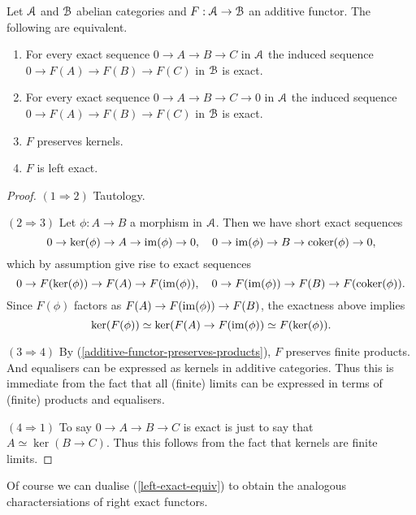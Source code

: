 \begin{lemma}
  \label{left-exact-equiv}
  Let $\mathcal{A}$ and $\mathcal{B}$ abelian categories and $F : \mathcal{A} \to \mathcal{B}$ an additive
  functor. The following are equivalent.
  \begin{enumerate}
  \item For every exact sequence $0 \to A \to B \to C$ in $\mathcal{A}$ the
    induced sequence $0 \to F(A) \to F(B) \to F(C)$ in $\mathcal{B}$ is exact.
  \item For every exact sequence $0 \to A \to B \to C \to 0$ in $\mathcal{A}$
    the induced sequence $0 \to F(A) \to F(B) \to F(C)$ in $\mathcal{B}$ is
    exact.
  \item $F$ preserves kernels.
  \item $F$ is left exact.
  \end{enumerate}
\end{lemma}

\begin{proof}
  $(1 \Rightarrow 2)$ Tautology.

  \medskip
  $(2 \Rightarrow 3)$ Let $\phi : A \to B$ a morphism in $\mathcal{A}$. Then we
  have short exact sequences
  \[
  0 \to \ker(\phi) \to A \to \operatorname{im}(\phi) \to 0, \quad 0 \to \operatorname{im}(\phi)
  \to B \to \operatorname{coker}(\phi) \to 0,
  \]
  which by assumption give rise to exact sequences
  \[
  0 \to F(\ker(\phi)) \to F(A) \to F(\operatorname{im}(\phi)), \quad 0 \to
  F(\operatorname{im}(\phi)) \to F(B) \to F(\operatorname{coker}(\phi)).
  \]
  Since $F(\phi)$ factors as $F(A) \to F(\operatorname{im}(\phi)) \to F(B)$, the
  exactness above implies
  \[
  \ker(F(\phi)) \simeq \ker(F(A) \to F(\operatorname{im}(\phi)) \simeq
  F(\ker(\phi)).
  \]

  \medskip
  $(3 \Rightarrow 4)$ By (\ref{additive-functor-preserves-products}),
  $F$ preserves finite products. And equalisers can be expressed as
  kernels in additive categories. Thus this is immediate from the fact
  that all (finite) limits can be expressed in terms of (finite)
  products and equalisers.

  \medskip
  $(4 \Rightarrow 1)$ To say $0 \to A \to B \to C$ is exact is just to
  say that $A \simeq \ker(B \to C)$. Thus this follows from the fact
  that kernels are finite limits.
\end{proof}

Of course we can dualise (\ref{left-exact-equiv}) to obtain the
analogous charactersiations of right exact functors.


\nocite{weibel, stacks}




